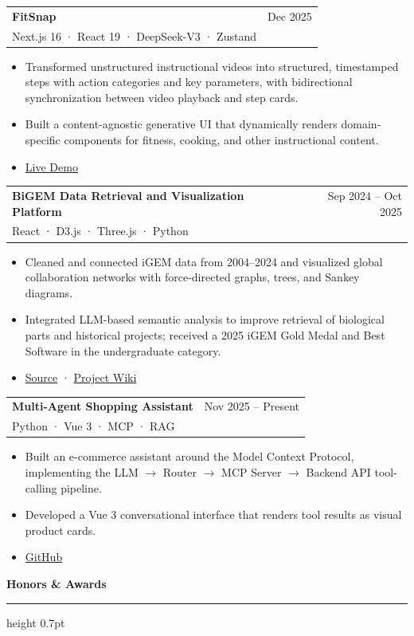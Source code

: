 \documentclass[10pt,a4paper]{article}
\makeatletter
\newcommand{\cvsection}[1]{%
  \vspace{0.72em}
  {\large\bfseries\color{Ink} #1}\par
  \vspace{0.22em}
  {\color{Rule}\hrule height 0.7pt}
  \vspace{0.36em}
}
\newcommand{\projectheading}[3]{%
  \begin{tabularx}{\textwidth}{@{}Xr@{}}
    {\bfseries\color{Ink} #1} & {\small\color{Muted} #3} \\
    {\small\color{Muted} #2} &
  \end{tabularx}
  \vspace{-0.28em}
}
\makeatother
\begin{document}
\vspace{0.2em}
\projectheading{FitSnap}{Next.js 16 · React 19 · DeepSeek-V3 · Zustand}{Dec 2025}
\begin{itemize}
  \item Transformed unstructured instructional videos into structured, timestamped steps with action categories and key parameters, with bidirectional synchronization between video playback and step cards.
  \item Built a content-agnostic generative UI that dynamically renders domain-specific components for fitness, cooking, and other instructional content.
  \item \href{https://fit-snap-beige.vercel.app/}{Live Demo}
\end{itemize}

\vspace{0.2em}
\projectheading{BiGEM Data Retrieval and Visualization Platform}{React · D3.js · Three.js · Python}{Sep 2024 -- Oct 2025}
\begin{itemize}
  \item Cleaned and connected iGEM data from 2004--2024 and visualized global collaboration networks with force-directed graphs, trees, and Sankey diagrams.
  \item Integrated LLM-based semantic analysis to improve retrieval of biological parts and historical projects; received a 2025 iGEM Gold Medal and Best Software in the undergraduate category.
  \item \href{https://gitlab.igem.org/2025/software-tools/bit-china}{Source} · \href{https://2025.igem.wiki/bit-china/software}{Project Wiki}
\end{itemize}

\vspace{0.2em}
\projectheading{Multi-Agent Shopping Assistant}{Python · Vue 3 · MCP · RAG}{Nov 2025 -- Present}
\begin{itemize}
  \item Built an e-commerce assistant around the Model Context Protocol, implementing the LLM $\rightarrow$ Router $\rightarrow$ MCP Server $\rightarrow$ Backend API tool-calling pipeline.
  \item Developed a Vue 3 conversational interface that renders tool results as visual product cards.
  \item \href{https://github.com/Sophie618/Multi-Agent}{GitHub}
\end{itemize}

\cvsection{Honors \& Awards}
\end{document}
